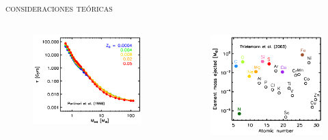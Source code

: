 \documentclass[xcolor=dvipsnames,4pt,hyperref={colorlinks,citecolor=black,linkcolor=black,urlcolor=black}]{beamer}
\begin{document}
\begin{frame}{\textsc{consideraciones teóricas}}


\begin{columns}
\begin{figure}
\includegraphics[scale=0.416]{img/yates2013-1}
\end{figure}

\begin{figure}
\includegraphics[scale=0.39]{img/yates2013-3}
\end{figure}


\end{columns}
\end{frame}
\end{document}
